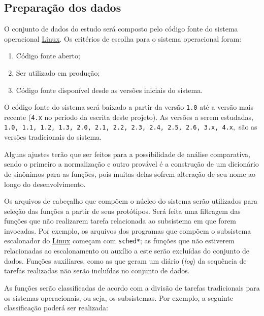 \documentclass[a4paper,12pt,twoside]{article}
\def\linux{\href{http://www.kernel.org/}{\sc Linux}}
\begin{document}
\subsection{Preparação dos dados}
\label{s:preparacao}

O conjunto de dados do estudo será composto pelo código fonte do
sistema operacional \linux. Os critérios de escolha para o sistema
operacional foram:

\begin{enumerate}
  \item Código fonte aberto;
  \item Ser utilizado em produção;
  \item Código fonte disponível desde as versões iniciais do sistema.
\end{enumerate}

O código fonte do sistema será baixado a partir da versão {\tt 1.0}
até a versão mais recente ({\tt 4.x} no período da escrita deste
projeto). As versões a serem estudadas, {\tt 1.0, 1.1, 1.2, 1.3, 2.0,
  2.1, 2.2, 2.3, 2.4, 2.5, 2.6, 3.x, 4.x},\ são as versões tradicionais
do sistema.

Alguns ajustes terão que ser feitos para a possibilidade de análise
comparativa, sendo o primeiro a normalização e outro provável é a
construção de um dicionário de sinônimos para as funções, pois muitas
delas sofrem alteração de seu nome ao longo do desenvolvimento.

Os arquivos de cabeçalho que compõem o núcleo do sistema serão
utilizados para seleção das funções a partir de seus protótipos.
Será feita uma filtragem das funções que não realizarem tarefa
relacionada ao subsistema em que forem invocadas. Por exemplo, os
arquivos dos programas que compõem o subsistema escalonador do
\linux{} começam com {\tt sched*}; as funções que não estiverem
relacionadas ao escalonamento ou auxílio a este serão excluídas do
conjunto de dados. Funções auxiliares, como as que geram um diário
({\em log}) da sequência de tarefas realizadas não serão incluídas no
conjunto de dados.

As funções serão classificadas de acordo com a divisão de tarefas
tradicionais para os sistemas operacionais, ou seja, os
subsistemas. Por exemplo, a seguinte classificação poderá ser
realizada:
\end{document}
